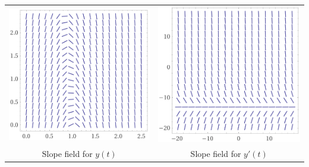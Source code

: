 \setlength{\len}{200pt}
\begin{tabular}{cc}
\includegraphics*[height=\len]{images/module9-y.png}
	& \includegraphics*[height=\len]{images/module9-yprime.png} \\
Slope field for $y(t)$
	& Slope field for $y'(t)$
\end{tabular}


